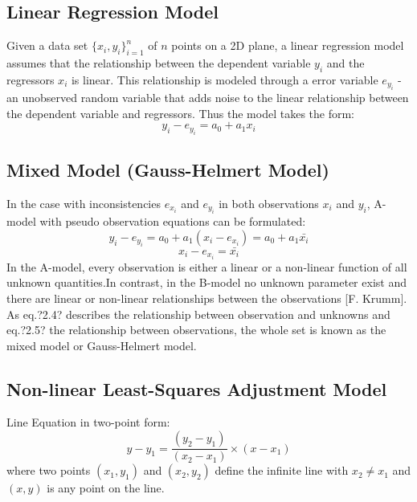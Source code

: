 \subsection{Linear Regression Model}
\label{subsec:LinearRegression}

Given a data set $\{x_i,y_i\}^n_{i=1}$ of $n$ points on a 2D plane, a linear regression model assumes that the relationship between the dependent variable $y_i$ and the regressors $x_i$ is linear. This relationship is modeled through a error variable $e_{y_i}$ -an unobserved random variable that adds noise to the linear relationship between the dependent variable and regressors.
Thus the model takes the form:
\begin{equation} %
y_i - e_{y_i} = a_0 + a_1x_i
\end{equation}


\subsection{Mixed Model (Gauss-Helmert Model)}
\label{subsec:MixedModel}

In the case with inconsistencies $e_{x_i}$ and $e_{y_i}$ in both observations $x_i$ and $y_i$, A-model with pseudo observation equations can be formulated:
\begin{equation} %
y_i - e_{y_i} = a_0 + a_1(x_i-e_{x_i}) = a_0 + a_1\bar{x_i}
\end{equation}
\begin{equation} %
x_i-e_{x_i} = \bar{x_i}
\end{equation}
In the A-model, every observation is either a linear or a non-linear function of all unknown quantities.In contrast, in the B-model no unknown parameter exist and there are linear or non-linear relationships between the observations [F. Krumm]. 
As eq.?2.4? describes the relationship between observation and unknowns and eq.?2.5? the relationship between observations, the whole set is known as the mixed model or Gauss-Helmert model.




\subsection{Non-linear Least-Squares Adjustment Model}
\label{subsec:NonLinear}

Line Equation in two-point form:
\begin{equation} %
y-y_1 = \dfrac{(y_2-y_1)}{(x_2-x_1)}\times(x-x_1)
\end{equation}
where two points $(x_1,y_1)$ and $(x_2,y_2)$ define the infinite line with $x_2\neq x_1$ and $(x,y)$ is any point on the line.

